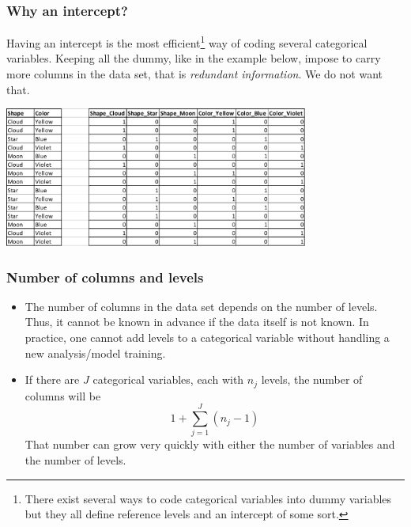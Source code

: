\begin{frame}
\frametitle{Why an intercept?}
Having an intercept is the most efficient\footnote{There exist several ways to code categorical variables into dummy variables but they all define reference levels and an intercept of some sort.} way of coding several categorical variables. Keeping all the dummy, like in the example below, impose to carry more columns in the data set, that is {\it redundant information}. We do not want that.
\begin{center}
\includegraphics[width=10cm]{../Graphs/Dummy_4.png}  
\end{center}
\end{frame}
\begin{frame}
\frametitle{Number of columns and levels}
\begin{itemize}
\item The number of columns in the data set depends on the number of levels. Thus, it cannot be known in advance if the data itself is not known. In practice, one cannot add levels to a categorical variable without handling a new analysis/model training. 
\item If there are $J$ categorical variables, each with $n_j$ levels, the number of columns will be
$$
1 + \sum_{j=1}^J (n_j - 1)
$$
That number can grow very quickly with either the number of variables and the number of levels. 
\end{itemize}
\end{frame}
